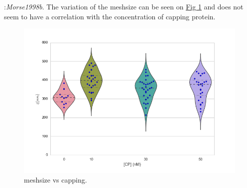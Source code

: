 \documentclass[A4paperpaper,11pt,english]{sphinxmanual}
\begin{document}
:\emph{Morse1998b}. The variation of the
meshsize can be seen on \hyperref[parts/part3:xi-violin]{Fig  \ref*{parts/part3:xi-violin}} and does not seem to have a
correlation with the concentration of capping protein.
\begin{figure}[htbp]
\centering
\capstart

\includegraphics[width=0.800\linewidth]{xi_violin.png}
\caption{meshsize vs capping.}\label{parts/part3:xi-violin}\end{figure}
\end{document}
